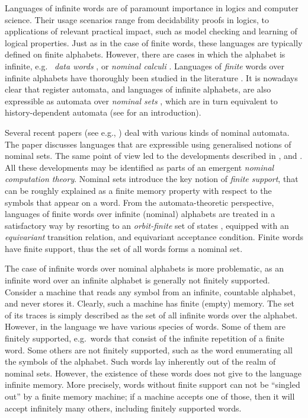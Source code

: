 

Languages of infinite words are of paramount importance in logics and computer science. Their usage scenarios range from decidability proofs in logics, 
 to applications of relevant practical impact, such as model checking and learning of logical properties. Just as in the case of finite words, these languages are typically defined on finite alphabets. However, there are cases in which the alphabet is infinite, e.g.\
\emph{data words} \cite{TODO}, or \emph{nominal calculi} \cite{Pi-calculus}. Languages of \emph{finite} words over infinite alphabets have thoroughly been studied in the literature \cite{KAMINKSIFRANCEZ,SEGOUFIN?,NIKOS}. 
It is nowadays clear that register automata, and languages of infinite alphabets, are also expressible as automata over \emph{nominal sets} \cite{GabbayPitts}, which are in turn equivalent  to history-dependent automata \cite{PISTORE,GADDUCCI,STATON,CIANCIA} (see \cite{CianciaTuostoTR} for an introduction). 

Several recent papers (see e.g., \cite{TOMOYUKI,GABBAYCIANCIA}) deal with various kinds of nominal automata. The paper \cite{MikLICS} discusses languages that are expressible using generalised notions of nominal sets. The same point of view led to the developments described in \cite{MikPOPL12}, and \cite{PittsPOPL13}. All these developments may be identified as parts of an emergent
\emph{nominal computation theory}. Nominal sets introduce the key notion of \emph{finite support}, that can be roughly explained as a finite memory property with respect to the symbols that appear on a word. From the automata-theoretic perspective, languages of finite words over infinite (nominal) alphabets are treated in a satisfactory way by resorting to an \emph{orbit-finite} set of states \cite{CianciaMontanariIC?}, equipped with an \emph{equivariant} transition relation, and equivariant acceptance condition. Finite words have finite support, thus the set of all words forms a nominal set. 

The case of infinite words over nominal alphabets is more problematic, as an infinite word over an infinite alphabet is generally not finitely supported. Consider a machine that reads any symbol from an infinite, countable alphabet, and never stores it. Clearly, such a machine has finite (empty) memory. The set of its traces is simply described as the set of all infinite words over the alphabet. However, in the language we have various species of words. Some of them are finitely supported, e.g.\ words that consist of the infinite repetition of a finite word. Some others are not finitely supported, such as the word enumerating all the symbols of the alphabet. Such words lay inherently out of the realm of nominal sets. However, the existence of these words does not give to the language infinite memory. More precisely,  words without finite support can not be ``singled out'' by a finite memory machine; if a machine accepts one of those, then it will accept infinitely many others, including finitely supported words.  

